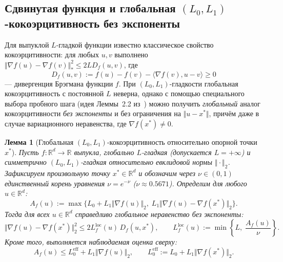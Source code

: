 \documentclass[11pt, a4paper]{article}
\newtheorem{lemma}{Лемма}[section]
\theoremstyle{definition}
\begin{document}
\subsection{Сдвинутая функция и глобальная $(L_0, L_1)$-кокоэрцитивность без экспоненты}

Для выпуклой $L$-гладкой функции известно классическое свойство кокоэрцитивности: для любых $u, v$ выполнено $\Vert \nabla f(u) - \nabla f(v) \Vert_*^2 \le 2 L D_f(u, v)$, где
\[
D_f(u, v) := f(u) - f(v) - \langle \nabla f(v), u - v \rangle \ge 0
\]
--- дивергенция Брэгмана функции $f$. При $(L_0, L_1)$-гладкости глобальная кокоэрцитивность с постоянной $L$ неверна, однако с помощью специального выбора пробного шага (идея Леммы~2.2 из~\cite{Gorbunov2024}) можно получить \emph{глобальный} аналог кокоэрцитивности \emph{без экспоненты} и без ограничения на $\Vert u - x^* \Vert$, причём даже в случае вариационного неравенства, где $\nabla f(x^*) \neq 0$.

\begin{lemma}[Глобальная $(L_0, L_1)$-кокоэрцитивность относительно опорной точки $x^*$]\label{lem:global_cocoercivity}
Пусть $f : \mathbb{R}^d \to \mathbb{R}$ выпукла, глобально $L$-гладкая (допускается $L = +\infty$) и симметрично $(L_0, L_1)$-гладкая относительно евклидовой нормы $\Vert \cdot \Vert_2$. Зафиксируем произвольную точку $x^* \in \mathbb{R}^d$ и обозначим через $\nu \in (0, 1)$ единственный корень уравнения $\nu = e^{-\nu}$ ($\nu \approx 0.5671$). Определим для любого $u \in \mathbb{R}^d$:
\begin{equation}\label{eq:ax_def}
A_f(u) := \max\big\{L_0 + L_1 \Vert \nabla f(u) \Vert_2,\; L_1 \Vert \nabla f(u) - \nabla f(x^*) \Vert_2\big\}.
\end{equation}
Тогда для всех $u \in \mathbb{R}^d$ справедливо глобальное неравенство без экспоненты:
\begin{equation}\label{eq:global_cocoercivity}
\Vert \nabla f(u) - \nabla f(x^*) \Vert_2^2 \le 2 L_f^{\mathrm{loc}}(u)\, D_f(u, x^*), \qquad L_f^{\mathrm{loc}}(u) := \min\left\{L,\; \frac{A_f(u)}{\nu}\right\}.
\end{equation}
Кроме того, выполняется наблюдаемая оценка сверху:
\begin{equation}\label{eq:ax_observable}
A_f(u) \le L_0^{\mathrm{eff}} + L_1 \Vert \nabla f(u) \Vert_2, \qquad L_0^{\mathrm{eff}} := L_0 + L_1 \Vert \nabla f(x^*) \Vert_2.
\end{equation}
\end{lemma}
\end{document}
